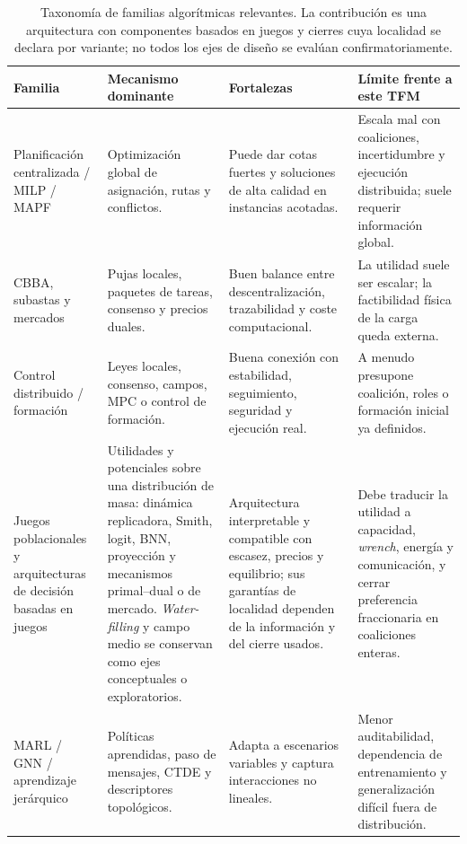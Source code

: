 \begin{table}[H]
\centering
\footnotesize
\renewcommand{\arraystretch}{1.15}
\begin{tabularx}{\textwidth}{p{3.0cm}Y Y Y}
\toprule
Familia & Mecanismo dominante & Fortalezas & Límite frente a este TFM \\
\midrule
Planificación centralizada / MILP / MAPF & Optimización global de asignación, rutas y conflictos. &
Puede dar cotas fuertes y soluciones de alta calidad en instancias acotadas. &
Escala mal con coaliciones, incertidumbre y ejecución distribuida; suele requerir información global. \\
CBBA, subastas y mercados & Pujas locales, paquetes de tareas, consenso y precios duales. &
Buen balance entre descentralización, trazabilidad y coste computacional. &
La utilidad suele ser escalar; la factibilidad física de la carga queda externa. \\
Control distribuido / formación & Leyes locales, consenso, campos, MPC o control de formación. &
Buena conexión con estabilidad, seguimiento, seguridad y ejecución real. &
A menudo presupone coalición, roles o formación inicial ya definidos. \\
Juegos poblacionales y arquitecturas de decisi\'on basadas en juegos & Utilidades y potenciales sobre una distribuci\'on de masa: din\'amica replicadora, Smith, logit, BNN, proyecci\'on y mecanismos primal--dual o de mercado. \emph{Water-filling} y campo medio se conservan como ejes conceptuales o exploratorios. &
Arquitectura interpretable y compatible con escasez, precios y equilibrio; sus garant\'ias de localidad dependen de la informaci\'on y del cierre usados. &
Debe traducir la utilidad a capacidad, \emph{wrench}, energ\'ia y comunicaci\'on, y cerrar preferencia fraccionaria en coaliciones enteras. \\
MARL / GNN / aprendizaje jerárquico & Políticas aprendidas, paso de mensajes, CTDE y descriptores topológicos. &
Adapta a escenarios variables y captura interacciones no lineales. &
Menor auditabilidad, dependencia de entrenamiento y generalización difícil fuera de distribución. \\
\bottomrule
\end{tabularx}
\caption{Taxonom\'ia de familias algor\'itmicas relevantes. La contribuci\'on es una arquitectura con componentes basados en juegos y cierres cuya localidad se declara por variante; no todos los ejes de dise\~no se eval\'uan confirmatoriamente.}
\label{tab:taxonomia_sota}
\end{table}

